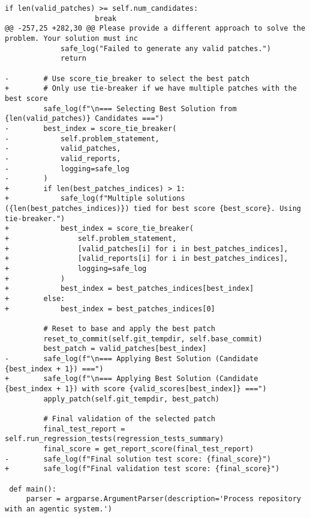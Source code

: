 \begin{lstlisting}[style=diffstyle]
                 if len(valid_patches) >= self.num_candidates:
                     break
@@ -257,25 +282,30 @@ Please provide a different approach to solve the problem. Your solution must inc
             safe_log("Failed to generate any valid patches.")
             return
 
-        # Use score_tie_breaker to select the best patch
+        # Only use tie-breaker if we have multiple patches with the best score
         safe_log(f"\n=== Selecting Best Solution from {len(valid_patches)} Candidates ===")
-        best_index = score_tie_breaker(
-            self.problem_statement,
-            valid_patches,
-            valid_reports,
-            logging=safe_log
-        )
+        if len(best_patches_indices) > 1:
+            safe_log(f"Multiple solutions ({len(best_patches_indices)}) tied for best score {best_score}. Using tie-breaker.")
+            best_index = score_tie_breaker(
+                self.problem_statement,
+                [valid_patches[i] for i in best_patches_indices],
+                [valid_reports[i] for i in best_patches_indices],
+                logging=safe_log
+            )
+            best_index = best_patches_indices[best_index]
+        else:
+            best_index = best_patches_indices[0]
 
         # Reset to base and apply the best patch
         reset_to_commit(self.git_tempdir, self.base_commit)
         best_patch = valid_patches[best_index]
-        safe_log(f"\n=== Applying Best Solution (Candidate {best_index + 1}) ===")
+        safe_log(f"\n=== Applying Best Solution (Candidate {best_index + 1}) with score {valid_scores[best_index]} ===")
         apply_patch(self.git_tempdir, best_patch)
 
         # Final validation of the selected patch
         final_test_report = self.run_regression_tests(regression_tests_summary)
         final_score = get_report_score(final_test_report)
-        safe_log(f"Final solution test score: {final_score}")
+        safe_log(f"Final validation test score: {final_score}")
 
 def main():
     parser = argparse.ArgumentParser(description='Process repository with an agentic system.')
\end{lstlisting}